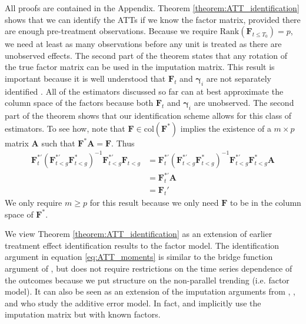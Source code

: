 \documentclass[12pt]{article}
\begin{document}
All proofs are contained in the Appendix. Theorem \ref{theorem:ATT_identification} shows that we can identify the ATTs if we know the factor matrix, provided there are enough pre-treatment observations. Because we require $\text{Rank}(\bm F_{t \leq T_0}) = p$, we need at least as many observations before any unit is treated as there are unobserved effects. The second part of the theorem states that any rotation of the true factor matrix can be used in the imputation matrix. This result is important because it is well understood that $\bm{F}_t$ and $\bm{\gamma}_i$ are not separately identified \citep{Bai_2009,Ahn_Lee_Schmidt_2013,xu2017generalized}. All of the estimators discussed so far can at best approximate the column space of the factors because both $\bm{F}_t$ and $\bm \gamma_i$ are unobserved. The second part of the theorem shows that our identification scheme allows for this class of estimators. To see how, note that $\bm F \in \text{col}(\bm F^*)$ implies the existence of a $m \times p$ matrix $\bm A$ such that $\bm F^* \bm A = \bm F$. Thus 
\begin{align*}
    \bm F_t^{*'} \left(\bm F_{t < g}^{*'} \bm F_{t < g}^{*} \right)^{-1} \bm F_{t < g}^{*'} \bm F_{t < g} 
    &= \bm F_t^{*'} \left(\bm F_{t < g}^{*'} \bm F_{t < g}^{*} \right)^{-1} \bm F_{t < g}^{*'} \bm F_{t < g}^* \bm A\\
    &= \bm F_t^{*'} \bm A\\
    &= \bm F_t'
\end{align*}
We only require $m \geq p$ for this result because we only need $\bm F$ to be in the column space of $\bm F^*$. 

We view Theorem \ref{theorem:ATT_identification} as an extension of earlier treatment effect identification results to the factor model. The identification argument in equation \eqref{eq:ATT_moments} is similar to the bridge function argument of \citet{Imbens_Kallus_Mao_2021}, but does not require restrictions on the time series dependence of the outcomes because we put structure on the non-parallel trending (i.e. factor model). It can also be seen as an extension of the imputation arguments from \citet{Gardner_2021}, \citet{Wooldridge_2021}, and \citet{Borusyak_Jaravel_Spiess_2021} who study the additive error model. In fact, \citet{Gardner_2021} and \citet{Borusyak_Jaravel_Spiess_2021} implicitly use the imputation matrix but with known factors. 

\end{document}
